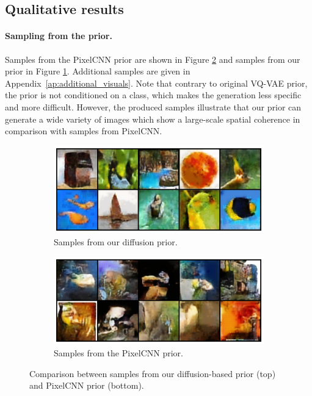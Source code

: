 \documentclass[nolayout]{article}
\theoremstyle{plain}
\theoremstyle{definition}
\theoremstyle{remark}
\begin{document}
\subsection{Qualitative results}
\paragraph{Sampling from the prior. }
Samples from the PixelCNN prior are shown in Figure \ref{fig:pixel_samples}
and samples from our prior in Figure \ref{fig:diffusion_samples}. Additional samples are given in Appendix~\ref{ap:additional_visuals}. Note that contrary to original VQ-VAE prior, the prior is not conditioned on a class, which makes the generation less specific and more difficult. However, the produced samples illustrate that our prior can generate a wide variety of images which show a large-scale spatial coherence in comparison with samples from PixelCNN. 


\begin{figure}[h!]

\begin{subfigure}{\linewidth}
    \centering
    \includegraphics[width=1.\linewidth]{images/ours/samples2.png}
    \caption{Samples from our diffusion prior.}
    \label{fig:diffusion_samples}
\end{subfigure}
\begin{subfigure}{\linewidth}
    \centering
    \includegraphics[width=1.\linewidth]{images/ours/pixel_samples.png}
    \caption{Samples from the PixelCNN prior.}
    \label{fig:pixel_samples}
\end{subfigure}
\caption{Comparison between samples from our diffusion-based prior (top) and PixelCNN prior (bottom).}
\label{fig:figures}
\end{figure}
\end{document}
